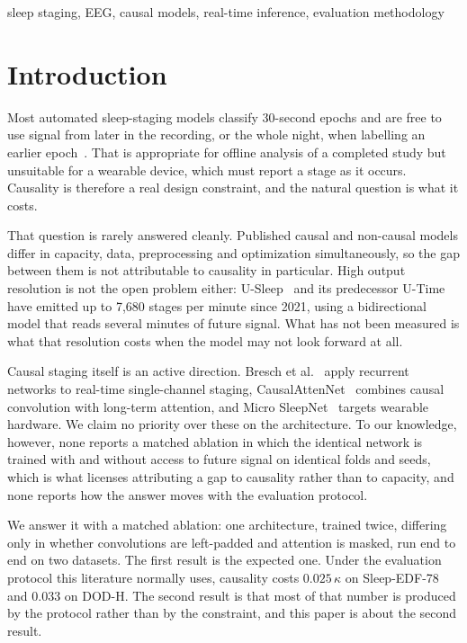 \documentclass[conference]{IEEEtran}
\begin{document}
\begin{IEEEkeywords}
sleep staging, EEG, causal models, real-time inference, evaluation methodology
\end{IEEEkeywords}

\section{Introduction}

Most automated sleep-staging models classify 30-second epochs and are free to use signal from
later in the recording, or the whole night, when labelling an earlier epoch~\cite{deepsleepnet,
attnsleep}. That is appropriate for offline analysis of a completed study but unsuitable for a
wearable device, which must report a stage as it occurs. Causality is therefore a real design
constraint, and the natural question is what it costs.

That question is rarely answered cleanly. Published causal and non-causal models differ in
capacity, data, preprocessing and optimization simultaneously, so the gap between them is not
attributable to causality in particular. High output resolution is not the open problem either:
U-Sleep~\cite{usleep} and its predecessor U-Time~\cite{utime} have emitted up to 7{,}680 stages
per minute since 2021, using a bidirectional model that reads several minutes of future signal.
What has not been measured is what that resolution costs when the model may not look forward at
all.

Causal staging itself is an active direction. Bresch et al.~\cite{bresch} apply recurrent
networks to real-time single-channel staging, CausalAttenNet~\cite{causalattennet} combines
causal convolution with long-term attention, and Micro SleepNet~\cite{microsleepnet} targets
wearable hardware. We claim no priority over these on the architecture. To our knowledge,
however, none reports a matched ablation in which the identical network is trained with and
without access to future signal on identical folds and seeds, which is what licenses attributing
a gap to causality rather than to capacity, and none reports how the answer moves with the
evaluation protocol.

We answer it with a matched ablation: one architecture, trained twice, differing only in whether
convolutions are left-padded and attention is masked, run end to end on two datasets. The first
result is the expected one. Under the evaluation protocol this literature normally uses,
causality costs $0.025\,\kappa$ on Sleep-EDF-78 and $0.033$ on DOD-H. The second result is that
most of that number is produced by the protocol rather than by the constraint, and this paper is
about the second result.
\end{document}
